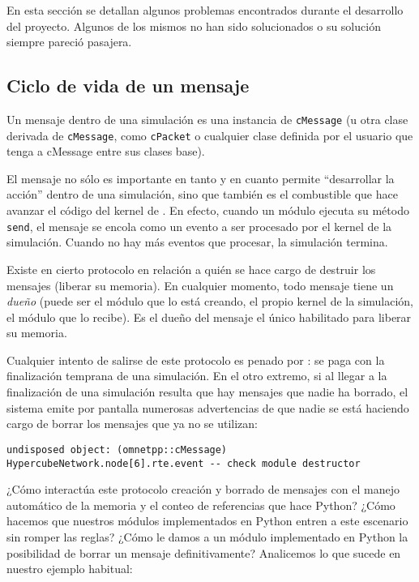 En esta sección se detallan algunos problemas encontrados durante el desarrollo
del proyecto. Algunos de los mismos no han sido solucionados o su solución
siempre pareció pasajera.

\subsection{Ciclo de vida de un mensaje}

Un mensaje dentro de una simulación \omnetpp{} es una instancia de \verb!cMessage!
(u otra clase derivada de \verb!cMessage!, como \verb!cPacket! o cualquier
clase definida por el usuario que tenga a cMessage entre sus clases base).

El mensaje no sólo es importante en tanto y en cuanto permite ``desarrollar la
acción'' dentro de una simulación, sino que también es el combustible que hace
avanzar el código del kernel de \omnetpp{}. En efecto, cuando un módulo ejecuta
su método \verb!send!, el mensaje se encola como un evento a ser procesado por
el kernel de la simulación. Cuando no hay más eventos que procesar, la
simulación termina.

Existe en \omnetpp{} cierto protocolo en relación a quién se hace cargo de
destruir los mensajes (liberar su memoria). En cualquier momento, todo mensaje
tiene un \textit{dueño} (puede ser el módulo que lo está creando, el propio
kernel de la simulación, el módulo que lo recibe). Es el dueño del mensaje el
único habilitado para liberar su memoria.

Cualquier intento de salirse de este protocolo es penado por \omnetpp{}: se paga
con la finalización temprana de una simulación. En el otro extremo, si al
llegar a la finalización de una simulación resulta que hay mensajes que nadie
ha borrado, el sistema emite por pantalla numerosas advertencias de que nadie
se está haciendo cargo de borrar los mensajes que ya no se utilizan:

\begin{verbatim}
undisposed object: (omnetpp::cMessage) HypercubeNetwork.node[6].rte.event -- check module destructor
\end{verbatim}

¿Cómo interactúa este protocolo creación y borrado de mensajes con el manejo
automático de la memoria y el conteo de referencias que hace Python? ¿Cómo
hacemos que nuestros módulos implementados en Python entren a este escenario
sin romper las reglas? ¿Cómo le damos a un módulo implementado en Python la
posibilidad de borrar un mensaje definitivamente? Analicemos lo que sucede en
nuestro ejemplo habitual:


